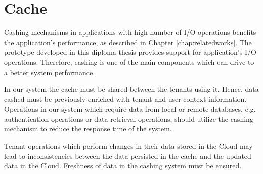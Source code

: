 \section{Cache}
\label{sec:cache}

Cashing mechanisms in applications with high number of I/O operations benefits the application's performance, as described in Chapter \ref{chap:relatedworks}. The prototype developed in this diploma thesis provides support for application's I/O operations. Therefore, cashing is one of the main components which can drive to a better system performance. 

In our system the cache must be shared between the tenants using it. Hence, data cashed must be previously enriched with tenant and user context information. Operations in our system which require data from local or remote databases, e.g. authentication operations or data retrieval operations, should utilize the cashing mechanism to reduce the response time of the system. 

Tenant operations which perform changes in their data stored in the Cloud may lead to inconsistencies between the data persisted in the cache and the updated data in the Cloud. Freshness of data in the cashing system must be ensured.  

\FloatBarrier